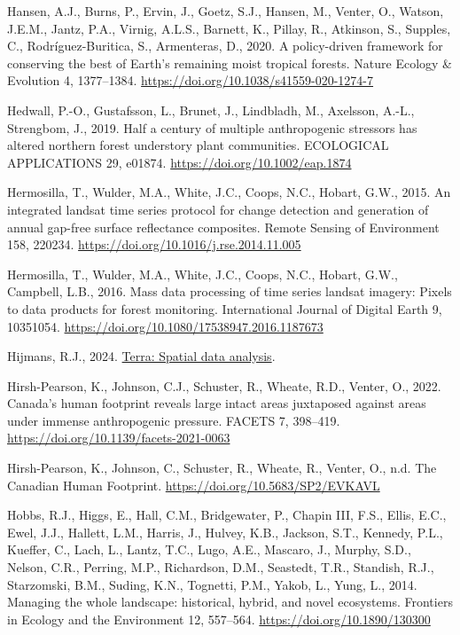 \documentclass[
]{agujournal2019}
\newlength{\cslhangindent}
\newenvironment{CSLReferences}[2] %
 {\begin{list}{}{%
  \setlength{\itemindent}{0pt}
  \setlength{\leftmargin}{0pt}
  \setlength{\parsep}{0pt}
  \ifodd #1
   \setlength{\leftmargin}{\cslhangindent}
   \setlength{\itemindent}{-1\cslhangindent}
  \fi
  \setlength{\itemsep}{#2\baselineskip}}}
 {\end{list}}
\begin{document}
\begin{CSLReferences}{1}{0}
Hansen, A.J., Burns, P., Ervin, J., Goetz, S.J., Hansen, M., Venter, O.,
Watson, J.E.M., Jantz, P.A., Virnig, A.L.S., Barnett, K., Pillay, R.,
Atkinson, S., Supples, C., Rodríguez-Buritica, S., Armenteras, D., 2020.
A policy-driven framework for conserving the best of Earth{'}s remaining
moist tropical forests. Nature Ecology \& Evolution 4, 1377--1384.
\url{https://doi.org/10.1038/s41559-020-1274-7}

Hedwall, P.-O., Gustafsson, L., Brunet, J., Lindbladh, M., Axelsson,
A.-L., Strengbom, J., 2019. Half a century of multiple anthropogenic
stressors has altered northern forest understory plant communities.
ECOLOGICAL APPLICATIONS 29, e01874.
\url{https://doi.org/10.1002/eap.1874}

Hermosilla, T., Wulder, M.A., White, J.C., Coops, N.C., Hobart, G.W.,
2015. An integrated landsat time series protocol for change detection
and generation of annual gap-free surface reflectance composites. Remote
Sensing of Environment 158, 220234.
\url{https://doi.org/10.1016/j.rse.2014.11.005}

Hermosilla, T., Wulder, M.A., White, J.C., Coops, N.C., Hobart, G.W.,
Campbell, L.B., 2016. Mass data processing of time series landsat
imagery: Pixels to data products for forest monitoring. International
Journal of Digital Earth 9, 10351054.
\url{https://doi.org/10.1080/17538947.2016.1187673}

Hijmans, R.J., 2024. \href{https://rspatial.org/}{Terra: Spatial data
analysis}.

Hirsh-Pearson, K., Johnson, C.J., Schuster, R., Wheate, R.D., Venter,
O., 2022. Canada{'}s human footprint reveals large intact areas
juxtaposed against areas under immense anthropogenic pressure. FACETS 7,
398--419. \url{https://doi.org/10.1139/facets-2021-0063}

Hirsh-Pearson, K., Johnson, C., Schuster, R., Wheate, R., Venter, O.,
n.d. The Canadian Human Footprint.
\url{https://doi.org/10.5683/SP2/EVKAVL}

Hobbs, R.J., Higgs, E., Hall, C.M., Bridgewater, P., Chapin III, F.S.,
Ellis, E.C., Ewel, J.J., Hallett, L.M., Harris, J., Hulvey, K.B.,
Jackson, S.T., Kennedy, P.L., Kueffer, C., Lach, L., Lantz, T.C., Lugo,
A.E., Mascaro, J., Murphy, S.D., Nelson, C.R., Perring, M.P.,
Richardson, D.M., Seastedt, T.R., Standish, R.J., Starzomski, B.M.,
Suding, K.N., Tognetti, P.M., Yakob, L., Yung, L., 2014. Managing the
whole landscape: historical, hybrid, and novel ecosystems. Frontiers in
Ecology and the Environment 12, 557--564.
\url{https://doi.org/10.1890/130300}


\end{CSLReferences}
\end{document}
